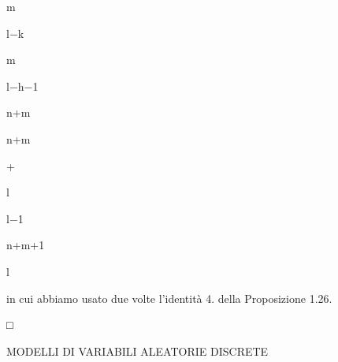 \documentclass[a4paper,portrait,12pt]{article}
\begin{document}
\begin{flushleft}
m
\end{flushleft}


\begin{flushleft}
l$-$k
\end{flushleft}





\begin{flushleft}
m
\end{flushleft}


\begin{flushleft}
l$-$h$-$1
\end{flushleft}





\begin{flushleft}
n+m
\end{flushleft}


\begin{flushleft}
n+m
\end{flushleft}


+


\begin{flushleft}
l
\end{flushleft}


\begin{flushleft}
l$-$1
\end{flushleft}


\begin{flushleft}
n+m+1
\end{flushleft}


\begin{flushleft}
l
\end{flushleft}





\begin{flushleft}
in cui abbiamo usato due volte l'identit\`{a} 4. della Proposizione 1.26.
\end{flushleft}





□










\begin{flushleft}
MODELLI DI VARIABILI ALEATORIE DISCRETE
\end{flushleft}
\end{document}
